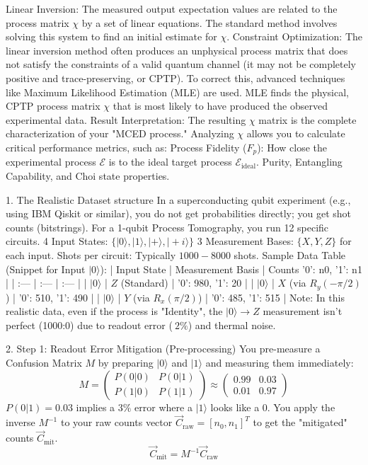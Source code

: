 Linear Inversion: The measured output expectation values are related to the process matrix $\chi$ by a set of linear equations. The standard method involves solving this system to find an initial estimate for $\chi$.
Constraint Optimization: The linear inversion method often produces an unphysical process matrix that does not satisfy the constraints of a valid quantum channel (it may not be completely positive and trace-preserving, or CPTP). To correct this, advanced techniques like Maximum Likelihood Estimation (MLE) are used.
MLE finds the physical, CPTP process matrix $\chi$ that is most likely to have produced the observed experimental data.
Result Interpretation: The resulting $\chi$ matrix is the complete characterization of your "MCED process." Analyzing $\chi$ allows you to calculate critical performance metrics, such as:
Process Fidelity ($F_p$): How close the experimental process $\mathcal{E}$ is to the ideal target process $\mathcal{E}_{\text{ideal}}$.
Purity, Entangling Capability, and Choi state properties.

1. The Realistic Dataset structure
In a superconducting qubit experiment (e.g., using IBM Qiskit or similar), you do not get probabilities directly; you get shot counts (bitstrings).
For a 1-qubit Process Tomography, you run 12 specific circuits.
4 Input States: $\{|0\rangle, |1\rangle, |+\rangle, |+i\rangle\}$
3 Measurement Bases: $\{X, Y, Z\}$ for each input.
Shots per circuit: Typically $1000 - 8000$ shots.
Sample Data Table (Snippet for Input $|0\rangle$):
| Input State | Measurement Basis | Counts {'0': n0, '1': n1} |
| :--- | :--- | :--- |
| $|0\rangle$ | $Z$ (Standard) | {'0': 980, '1': 20} |
| $|0\rangle$ | $X$ (via $R_y(-\pi/2)$) | {'0': 510, '1': 490} |
| $|0\rangle$ | $Y$ (via $R_x(\pi/2)$) | {'0': 485, '1': 515} |
Note: In this realistic data, even if the process is "Identity", the $|0\rangle \to Z$ measurement isn't perfect (1000:0) due to readout error ($~2\%$) and thermal noise.

2. Step 1: Readout Error Mitigation (Pre-processing)
You pre-measure a Confusion Matrix $M$ by preparing $|0\rangle$ and $|1\rangle$ and measuring them immediately:
$$M = \begin{pmatrix} P(0|0) & P(0|1) \\ P(1|0) & P(1|1) \end{pmatrix} \approx \begin{pmatrix} 0.99 & 0.03 \\ 0.01 & 0.97 \end{pmatrix}$$
$P(0|1) = 0.03$ implies a $3\%$ error where a $|1\rangle$ looks like a $0$.
You apply the inverse $M^{-1}$ to your raw counts vector $\vec{C}_{\text{raw}} = [n_0, n_1]^T$ to get the "mitigated" counts $\vec{C}_{\text{mit}}$.
$$\vec{C}_{\text{mit}} = M^{-1} \vec{C}_{\text{raw}}$$

